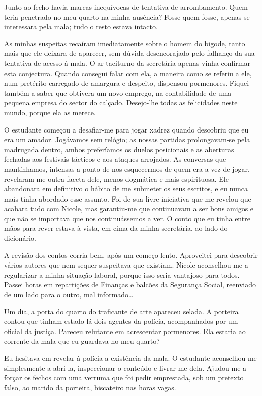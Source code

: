 Junto ao fecho havia marcas inequívocas de tentativa de arrombamento.
Quem teria penetrado no meu quarto na minha ausência? Fosse quem
fosse, apenas se interessara pela mala; tudo o resto estava intacto.

As minhas suspeitas recaíram imediatamente sobre o homem do bigode,
tanto mais que ele deixara de aparecer, sem dúvida desencorajado pelo
falhanço da sua tentativa de acesso à mala. O ar taciturno da secretária
apenas vinha confirmar esta conjectura. Quando consegui falar com ela, a
maneira como se referiu a ele, num pretérito carregado de amargura e
despeito, dispensou pormenores. Fiquei também a saber que obtivera um
novo emprego, na contabilidade de uma pequena empresa do sector do
calçado. Desejo-lhe
todas as felicidades neste mundo, porque ela as merece.

O estudante começou a desafiar-me para jogar xadrez quando descobriu que
eu era um amador. Jogávamos sem relógio; as nossas partidas
prolongavam-se pela madrugada dentro, ambos preferíamos os duelos
posicionais e as aberturas fechadas aos festivais tácticos e aos ataques
arrojados. As conversas que mantínhamos, intensas a ponto de nos
esquecermos de quem era a vez de jogar, revelaram-me outra faceta dele,
menos dogmática e mais espirituosa. Ele abandonara em definitivo o
hábito de me submeter os seus escritos, e eu nunca mais tinha abordado
esse assunto. Foi de sua livre iniciativa que me revelou que acabara
tudo com Nicole, mas garantiu-me que continuavam a ser bons amigos e que não se importava que nos
continuássemos a ver. O conto que eu tinha entre mãos para rever estava
à vista, em cima da minha secretária, ao lado do dicionário.

A revisão dos contos corria bem, após um começo lento. Aproveitei para
descobrir vários autores que nem sequer suspeitava que existiam. Nicole
aconselhou-me a regularizar a minha situação laboral, porque isso seria
vantajoso para todos. Passei horas em repartições de Finanças e balcões
da Segurança Social, reenviado de um lado para o outro, mal
informado\ldots{}

Um dia, a porta do quarto do traficante de arte apareceu selada. A
porteira contou que tinham estado lá dois agentes da polícia,
acompanhados por um oficial da justiça. Pareceu relutante em acrescentar
pormenores. Ela estaria ao corrente da mala que eu guardava no meu
quarto?

Eu hesitava em revelar à polícia a existência da mala. O estudante
aconselhou-me simplesmente a abri-la, inspeccionar o conteúdo e
livrar-me dela. Ajudou-me a forçar os fechos com
uma verruma que foi pedir emprestada, sob um pretexto falso, ao marido
da porteira, biscateiro nas horas vagas.

